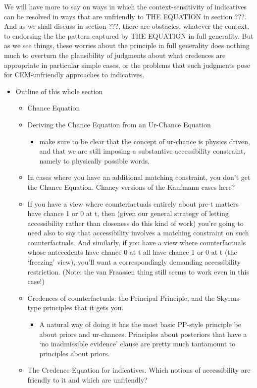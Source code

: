 \documentclass[leqno, 11pt, a5paper, openany]{article}
\begin{document}
We will have more to say on ways in which the context-sensitivity of indicatives can be resolved in ways that are unfriendly to THE EQUATION in section ???. And as we shall discuss in section ???, there are obstacles, whatever the context, to endorsing the the pattern captured by THE EQUATION in full generality. But as we see things, these worries about the principle in full generality does nothing much to overturn the plausibility of judgments about what credences are appropriate in particular simple cases, or the problems that such judgments pose for CEM-unfriendly approaches to indicatives.

\begin{itemize}
\item
  Outline of this whole section

  \begin{itemize}
  \item
    Chance Equation
  \item
    Deriving the Chance Equation from an Ur-Chance Equation

    \begin{itemize}
        \item
      make sure to be clear that the concept of ur-chance is physics
      driven, and that we are still imposing a substantive accessibility
      constraint, namely to physically possible words.
    \end{itemize}
  \item
    In cases where you have an additional matching constraint, you don't
    get the Chance Equation. Chancy versions of the Kaufmann cases here?
  \item
    If you have a view where counterfactuals entirely about pre-t
    matters have chance 1 or 0 at t, then (given our general strategy of
    letting accessibility rather than closeness do this kind of work)
    you're going to need also to say that accessibility involves a
    matching constraint on such counterfactuals. And similarly, if you
    have a view where counterfactuals whose antecedents have chance 0 at
    t all have chance 1 or 0 at t (the ‘freezing’ view), you'll want a
    correspondingly demanding accessibility restriction. (Note: the van
    Fraassen thing still seems to work even in this case!)
  \item
    Credences of counterfactuals: the Principal Principle, and the
    Skyrms-type principles that it gets you.

    \begin{itemize}
        \item
      A natural way of doing it has the most basic PP-style principle be
      about priors and ur-chances. Principles about posteriors that have
      a ‘no inadmissible evidence’ clause are pretty much tantamount to
      principles about priors.
    \end{itemize}
  \item
    The Credence Equation for indicatives. Which notions of
    accessibility are friendly to it and which are unfriendly?


\end{itemize}
\end{itemize}
\end{document}
